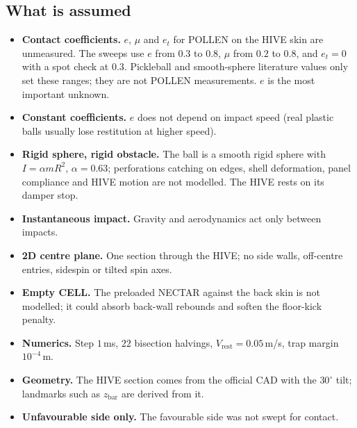 \subsection{What is assumed}
\label{sec:contact-assumptions}

\begin{itemize}
  \item \textbf{Contact coefficients.} $e$, $\mu$ and $e_t$ for POLLEN on the HIVE skin are
  unmeasured. The sweeps use $e$ from $0.3$\assumed{} to $0.8$\assumed, $\mu$ from
  $0.2$\assumed{} to $0.8$\assumed, and $e_t=0$\assumed{} with a spot check at
  $0.3$\assumed. Pickleball and smooth-sphere literature values only set these ranges; they are
  not POLLEN measurements. $e$ is the most important unknown.
  \item \textbf{Constant coefficients.} $e$ does not depend on impact speed (real plastic balls
  usually lose restitution at higher speed).
  \item \textbf{Rigid sphere, rigid obstacle.} The ball is a smooth rigid sphere with
  $I=\alpha mR^2$, $\alpha=0.63$\derived; perforations catching on edges, shell deformation,
  panel compliance and HIVE motion are not modelled. The HIVE rests on its damper stop.
  \item \textbf{Instantaneous impact.} Gravity and aerodynamics act only between impacts.
  \item \textbf{2D centre plane.} One section through the HIVE; no side walls, off-centre
  entries, sidespin or tilted spin axes.
  \item \textbf{Empty CELL.} The preloaded NECTAR against the back skin is not modelled; it
  could absorb back-wall rebounds and soften the floor-kick penalty.
  \item \textbf{Numerics.} Step $1$\,\unit{ms}\assumed, $22$\assumed{} bisection halvings,
  $V_{\text{rest}}=0.05$\,\unit{m/s}\assumed, trap margin $10^{-4}$\,\unit{m}\assumed.
  \item \textbf{Geometry.} The HIVE section comes from the official CAD with the $30^\circ$\confirmed{}
  tilt; landmarks such as $z_{\text{bar}}$ are derived from it.
  \item \textbf{Unfavourable side only.} The favourable side was not swept for contact.
\end{itemize}
